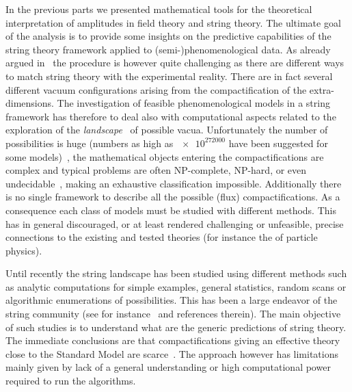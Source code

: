 In the previous parts we presented mathematical tools for the theoretical interpretation of amplitudes in field theory and string theory.
The ultimate goal of the analysis is to provide some insights on the predictive capabilities of the string theory framework applied to (semi-)phenomenological data.
As already argued in~ the procedure is however quite challenging as there are different ways to match string theory with the experimental reality.
There are in fact several different vacuum configurations arising from the compactification of the extra-dimensions.
The investigation of feasible phenomenological models in a string framework has therefore to deal also with computational aspects related to the exploration of the \emph{landscape}~\cite{Douglas:2003:StatisticsStringTheory} of possible vacua.
Unfortunately the number of possibilities is huge (numbers as high as $\num{e272000}$ have been suggested for some models)~\cite{Douglas:2003:StatisticsStringTheory, Ashok:2004:CountingFluxVacua, Taylor:2015:FtheoryGeometryMost, Taylor:2018:ScanningSkeleton4D, Constantin:2019:CountingStringTheory}, the mathematical objects entering the compactifications are complex and typical problems are often NP-complete, NP-hard, or even undecidable~\cite{Denef:2007:ComputationalComplexityLandscape, Halverson:2019:ComputationalComplexityVacua}, making an exhaustive classification impossible.
Additionally there is no single framework to describe all the possible (flux) compactifications.
As a consequence each class of models must be studied with different methods.
This has in general discouraged, or at least rendered challenging or unfeasible, precise connections to the existing and tested theories (for instance the \sm of particle physics).

Until recently the string landscape has been studied using different methods such as analytic computations for simple examples, general statistics, random scans or algorithmic enumerations of possibilities.
This has been a large endeavor of the string community (see for instance~\cite{Grana:2006:FluxCompactificationsString, Brennan:2018:StringLandscapeSwampland} and references therein).
The main objective of such studies is to understand what are the generic predictions of string theory.
The immediate conclusions are that compactifications giving an effective theory close to the Standard Model are scarce~\cite{Dijkstra:2005:ChiralSupersymmetricStandard, Blumenhagen:2005:StatisticsSupersymmetricDbrane, Douglas:2007:LandscapeIntersectingBrane, Anderson:2014:ComprehensiveScanHeterotic}.
The approach however has limitations mainly given by lack of a general understanding or high computational power required to run the algorithms.

